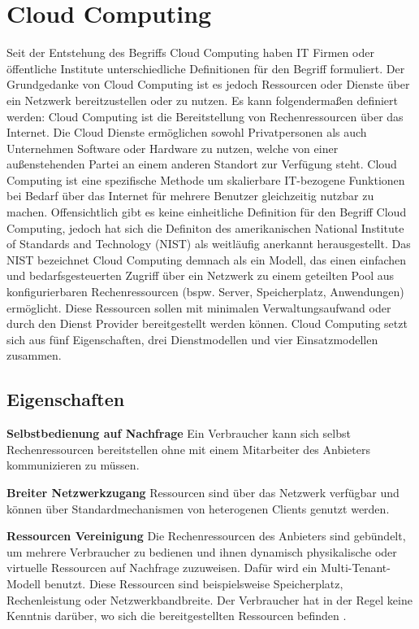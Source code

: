 \section{Cloud Computing}
Seit der Entstehung des Begriffs \glqq Cloud Computing\grqq{} haben IT Firmen oder öffentliche Institute unterschiedliche Definitionen für den Begriff formuliert. Der Grundgedanke von Cloud Computing ist es jedoch Ressourcen oder Dienste über ein Netzwerk bereitzustellen oder zu nutzen. Es kann folgendermaßen definiert werden: Cloud Computing ist die Bereitstellung von Rechenressourcen über das Internet. Die Cloud Dienste ermöglichen sowohl Privatpersonen als auch Unternehmen Software oder Hardware zu nutzen, welche von einer außenstehenden Partei an einem anderen Standort zur Verfügung steht\cite{canada}. Cloud Computing ist eine spezifische Methode um skalierbare IT-bezogene Funktionen bei Bedarf über das Internet für mehrere Benutzer gleichzeitig nutzbar zu machen\cite{gartner}.
Offensichtlich gibt es keine einheitliche Definition für den Begriff \glqq Cloud Computing\grqq, jedoch hat sich die Definiton des amerikanischen National Institute of Standards and Technology (NIST) als weitläufig anerkannt herausgestellt. Das NIST bezeichnet Cloud Computing demnach als ein Modell, das einen einfachen und bedarfsgesteuerten Zugriff über ein Netzwerk zu einem geteilten Pool aus konfigurierbaren Rechenressourcen (bspw. Server, Speicherplatz, Anwendungen) ermöglicht. Diese Ressourcen sollen mit minimalen Verwaltungsaufwand oder durch den Dienst Provider bereitgestellt werden können. Cloud Computing setzt sich aus fünf Eigenschaften, drei Dienstmodellen und vier Einsatzmodellen zusammen\cite{nist_definition}.

\subsection{Eigenschaften}

\textbf{Selbstbedienung auf Nachfrage} 
Ein Verbraucher kann sich selbst Rechenressourcen bereitstellen ohne mit einem Mitarbeiter des Anbieters kommunizieren zu müssen\cite{nist_definition}.

\textbf{Breiter Netzwerkzugang}
Ressourcen sind über das Netzwerk verfügbar und können über Standardmechanismen von heterogenen Clients genutzt werden\cite{nist_definition}.

\textbf{Ressourcen Vereinigung}
Die Rechenressourcen des Anbieters sind gebündelt, um mehrere Verbraucher zu bedienen und ihnen dynamisch physikalische oder virtuelle Ressourcen auf Nachfrage zuzuweisen. Dafür wird ein Multi-Tenant-Modell benutzt. Diese Ressourcen sind beispielsweise Speicherplatz, Rechenleistung oder Netzwerkbandbreite. Der Verbraucher hat in der Regel keine Kenntnis darüber, wo sich die bereitgestellten Ressourcen befinden \cite{nist_definition}.


